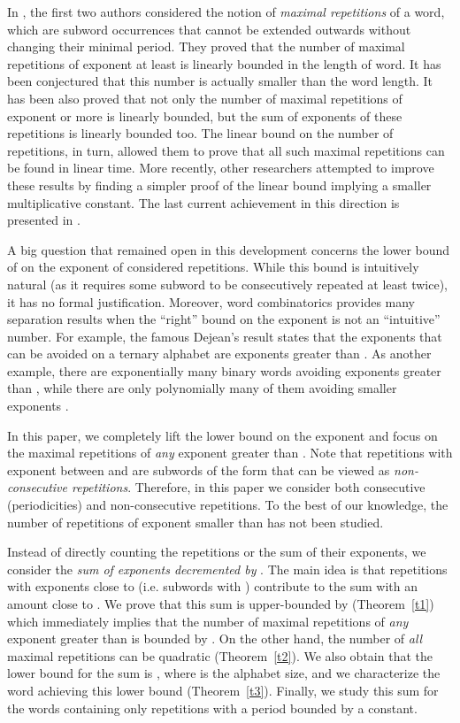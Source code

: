 \documentclass[11pt]{article}
\begin{document}
In \cite{KolpakovKucherovFCT99,KolpakovKucherovJDA00}, the first two
authors considered the notion of {\em maximal repetitions} of a word,
which are subword occurrences that cannot be extended outwards without
changing their minimal period. They proved that the number of maximal
repetitions of exponent at least  is linearly bounded in the length
of word. It has been conjectured that this number is actually smaller
than the word length. It has been also proved that not only the number
of maximal repetitions of exponent  or more is linearly bounded,
but the sum of exponents of these repetitions is linearly bounded
too. 
The linear bound on the number of repetitions, in turn, allowed them to prove that all such
maximal repetitions can be found in linear time. More recently, other
researchers attempted to improve these results by finding a simpler
proof of the linear bound implying a smaller multiplicative
constant. The last current achievement in this direction is presented
in \cite{CrochemoreIlieTintaCPM08}. 

A big question that remained open in this development concerns the
lower bound of  on the exponent of considered repetitions. While
this bound is intuitively natural (as it requires some subword to be
consecutively repeated at least twice), it has no formal
justification. Moreover, word combinatorics provides many separation
results when the ``right'' bound on the exponent is not an
``intuitive'' number. For example, the famous Dejean's result states
that the exponents that can be avoided on a ternary alphabet are
exponents greater than  \cite{Dejean72}. As another example, there are
exponentially many binary words avoiding exponents greater than
, while there are only polynomially many of them avoiding
smaller exponents \cite{KarSha04}. 

In this paper, we completely lift the lower bound on the exponent and focus on the
maximal repetitions of {\em any} exponent greater than . Note that
repetitions with exponent between  and  are subwords of the form
 that can be viewed as {\em non-consecutive
  repetitions}. Therefore, in this paper we consider both consecutive
(periodicities) and non-consecutive repetitions. To the best of our
knowledge, the number of repetitions of exponent smaller than  has
not been studied. 

Instead of directly counting the repetitions or the sum of their
exponents, we consider the {\em sum of exponents decremented by
  }. The main idea is that repetitions with exponents close to 
(i.e. subwords  with ) contribute to the sum with an
amount close to . We prove that this sum is upper-bounded by
 (Theorem~\ref{t1}) which immediately implies that the number
of maximal repetitions of {\em any} exponent greater than
 is bounded by . On the
other hand, the number of {\em all} maximal repetitions can be
quadratic (Theorem~\ref{t2}). We also obtain that the lower bound for
the sum is , where  is the alphabet size, and we
characterize the word achieving this lower bound
(Theorem~\ref{t3}). Finally, we study this sum for the words
containing only repetitions with a period bounded by a constant. 
\end{document}
